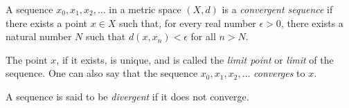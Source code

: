 \documentclass[12pt]{article}
\begin{document}
A sequence $x_0, x_1, x_2, \dots$ in a metric space $(X,d)$ is a \emph{convergent sequence} if there exists a point $x \in X$ such that, for every real number $\epsilon > 0$, there exists a natural number $N$ such that $d(x,x_n) < \epsilon$ for all $n > N$.

The point $x$, if it exists, is unique, and is called the \emph{limit point} or \emph{limit} of the sequence. One can also say that the sequence $x_0, x_1, x_2, \dots$ \emph{converges} to $x$.

A sequence is said to be \emph{divergent} if it does not converge.
\end{document}
